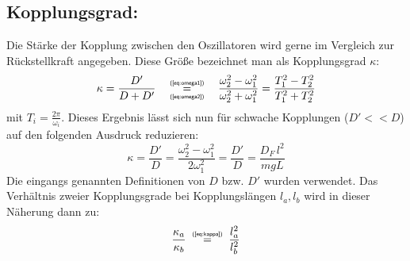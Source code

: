 \subsection*{Kopplungsgrad:}
Die Stärke der Kopplung zwischen den Oszillatoren wird gerne im Vergleich zur Rückstellkraft angegeben. Diese Größe bezeichnet man als Kopplungsgrad \(\kappa\):
\begin{equation}
\kappa = \frac{D'}{D + D'}\quad\mathrel{ \overset{\mbox{\normalfont\tiny\sffamily (\ref{eq:omega1})}}{ \underset{\mbox{\normalfont\tiny\sffamily (\ref{eq:omega2})}}{=} } }\quad\frac{\omega_2^2 - \omega_1^2}{\omega_2^2 + \omega_1^2} = \frac{T_1^2 - T_2^2}{T_1^2 + T_2^2}
\label{eq:kappa}
\end{equation}
mit \(T_i = \frac{2\pi}{\omega_i}\). Dieses Ergebnis lässt sich nun für schwache Kopplungen (\(D'<<D\)) auf den folgenden Ausdruck reduzieren:
\begin{equation}
\kappa = \frac{D'}{D} = \frac{\omega_2^2 - \omega_1^2}{2\omega_1^2} = \frac{D'}{D} = \frac{D_F\, l^2}{m g L}\label{eq:kappareal}
\end{equation}
Die eingangs genannten Definitionen von \(D\) bzw. \(D'\) wurden verwendet. Das Verhältnis zweier Kopplungsgrade bei Kopplungslängen \(l_a, l_b\) wird in dieser Näherung dann zu:
\begin{equation}
\frac{\kappa_a}{\kappa_b} \;\mathrel{ \overset{\mbox{\normalfont\tiny\sffamily (\ref{eq:kappa})}}{ \underset{\mbox{\normalfont\tiny\sffamily }}{=} } }\; \frac{l_a^2}{l_b^2}
\label{eq:kappaab}
\end{equation}









